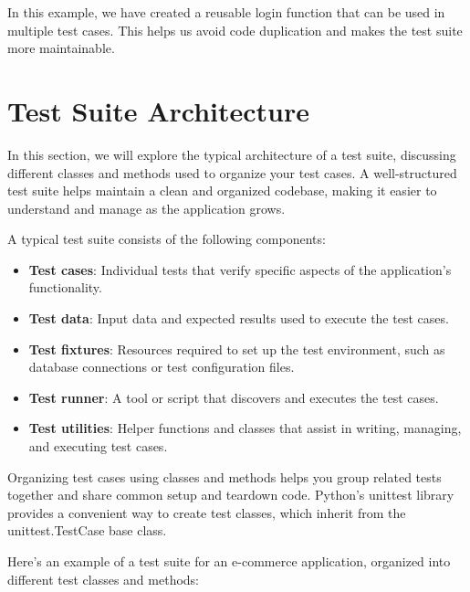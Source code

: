 \documentclass[
  paper=a4,
  ,captions=tableheading
]{scrartcl}
\providecommand{\tightlist}{%
  \setlength{\itemsep}{0pt}\setlength{\parskip}{0pt}}
\begin{document}
In this example, we have created a reusable login function that can be
used in multiple test cases. This helps us avoid code duplication and
makes the test suite more maintainable.

\hypertarget{test-suite-architecture}{%
\section{Test Suite Architecture}\label{test-suite-architecture}}

In this section, we will explore the typical architecture of a test
suite, discussing different classes and methods used to organize your
test cases. A well-structured test suite helps maintain a clean and
organized codebase, making it easier to understand and manage as the
application grows.

A typical test suite consists of the following components:

\begin{itemize}
\tightlist
\item
  \textbf{Test cases}: Individual tests that verify specific aspects of
  the application's functionality.
\item
  \textbf{Test data}: Input data and expected results used to execute
  the test cases.
\item
  \textbf{Test fixtures}: Resources required to set up the test
  environment, such as database connections or test configuration files.
\item
  \textbf{Test runner}: A tool or script that discovers and executes the
  test cases.
\item
  \textbf{Test utilities}: Helper functions and classes that assist in
  writing, managing, and executing test cases.
\end{itemize}

Organizing test cases using classes and methods helps you group related
tests together and share common setup and teardown code. Python's
unittest library provides a convenient way to create test classes, which
inherit from the unittest.TestCase base class.

Here's an example of a test suite for an e-commerce application,
organized into different test classes and methods:
\end{document}
